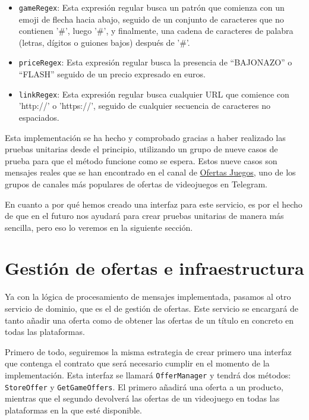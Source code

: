 \begin{itemize}
    \item \verb|gameRegex|: Esta expresión regular busca un patrón que comienza 
    con un emoji de flecha hacia abajo, seguido de un conjunto de caracteres que no 
    contienen '\#', luego '\#', y finalmente, una cadena de caracteres de palabra 
    (letras, dígitos o guiones bajos) después de '\#'.
    \item \verb|priceRegex|: Esta expresión regular busca la presencia de 
    ``BAJONAZO'' o ``FLASH'' seguido de un precio expresado en euros.
    \item \verb|linkRegex|: Esta expresión regular busca cualquier URL que comience 
    con 'http://' o 'https://', seguido de cualquier secuencia de caracteres no 
    espaciados.
\end{itemize}

Esta implementación se ha hecho y comprobado gracias a haber realizado las pruebas 
unitarias desde el principio, utilizando un grupo de nueve casos de prueba para que 
el método funcione como se espera. Estos nueve casos son mensajes reales que se han 
encontrado en el canal de \href{https://ofertasjuegos.es/}{Ofertas Juegos}, uno de 
los grupos de canales más populares de ofertas de videojuegos en Telegram.

En cuanto a por qué hemos creado una interfaz para este servicio, es por el hecho 
de que en el futuro nos ayudará para crear pruebas unitarias de manera más 
sencilla, pero eso lo veremos en la siguiente sección.

\section{Gestión de ofertas e infraestructura}

Ya con la lógica de procesamiento de mensajes implementada, pasamos al otro 
servicio de dominio, que es el de gestión de ofertas. Este servicio se encargará de 
tanto añadir una oferta como de obtener las ofertas de un título en concreto en 
todas las plataformas.

Primero de todo, seguiremos la misma estrategia de crear primero una interfaz que 
contenga el contrato que será necesario cumplir en el momento de la implementación. 
Esta interfaz se llamará \verb|OfferManager| y tendrá dos métodos: 
\verb|StoreOffer| y \verb|GetGameOffers|. El primero añadirá una oferta a un 
producto, mientras que el segundo devolverá las ofertas de un videojuego en todas 
las plataformas en la que esté disponible.

